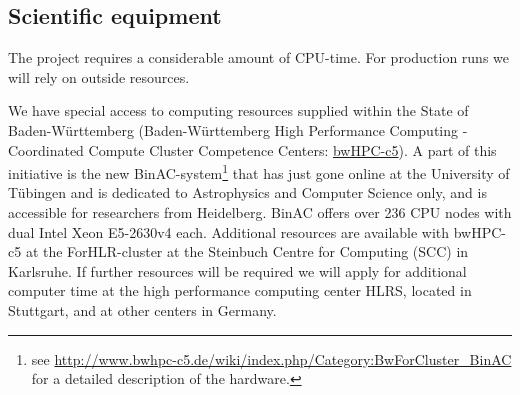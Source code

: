 \documentclass[10pt,fleqn,twoside,a4paper]{article}
\begin{document}
\subsection{Scientific equipment}

The project requires a considerable amount of CPU-time. For production runs
we will rely on outside resources. 

We have special access to computing resources supplied within the State of
Baden-W\"urttemberg (Baden-W\"urttemberg High Performance Computing -
Coordinated Compute Cluster Competence Centers:
\href{https://www.bwhpc-c5.de}{bwHPC-c5}).  A part of this initiative is the
new BinAC-system\footnote{see
  \url{http://www.bwhpc-c5.de/wiki/index.php/Category:BwForCluster\_BinAC}
  for a detailed description of the hardware.}  that has just gone online at
the University of T\"ubingen and is dedicated to Astrophysics and Computer
Science only, and is accessible for researchers from Heidelberg.  BinAC
offers over 236 CPU nodes with dual Intel Xeon E5-2630v4 each. Additional
resources are available with bwHPC-c5 at the ForHLR-cluster at the Steinbuch
Centre for Computing (SCC) in Karlsruhe.  If further resources will be
required we will apply for additional computer time at the high performance
computing center HLRS, located in Stuttgart, and at other centers in
Germany.



%



\end{document}

